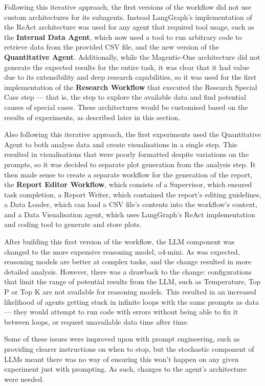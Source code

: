 \documentclass[a4paper]{report}
\begin{document}
Following this iterative approach, the first versions of the workflow did not use custom architectures for its subagents. Instead LangGraph's implementation of the ReAct architecture was used for any agent that required tool usage, such as the \textbf{Internal Data Agent}, which now used a tool to run arbitrary code to retrieve data from the provided CSV file, and the new version of the \textbf{Quantitative Agent}. Additionally, while the Magentic-One architecture did not generate the expected results for the entire task, it was clear that it had value due to its extensibility and deep research capabilities, so it was used for the first implementation of the \textbf{Research Workflow} that executed the Research Special Case step --- that is, the step to explore the available data and find potential causes of special cases. These architectures would be customised based on the results of experiments, as described later in this section.

Also following this iterative approach, the first experiments used the Quantitative Agent to both analyse data and create visualisations in a single step. This resulted in visualisations that were poorly formatted despite variations on the prompts, so it was decided to separate plot generation from the analysis step. It then made sense to create a separate workflow for the generation of the report, the \textbf{Report Editor Workflow}, which consists of a Supervisor, which ensured task completion, a Report Writer, which contained the report's editing guidelines, a Data Loader, which can load a CSV file's contents into the workflow's context, and a Data Visualisation agent, which uses LangGraph's ReAct implementation and coding tool to generate and store plots.

After building this first version of the workflow, the LLM component was changed to the more expensive reasoning model, o4-mini. As was expected, reasoning models are better at complex tasks, and the change resulted in more detailed analysis. However, there was a drawback to the change: configurations that limit the range of potential results from the LLM, such as Temperature, Top P or Top K are not available for reasoning models. This resulted in an increased likelihood of agents getting stuck in infinite loops with the same prompts as data --- they would attempt to run code with errors without being able to fix it between loops, or request unavailable data time after time.

Some of these issues were improved upon with prompt engineering, such as providing clearer instructions on when to stop, but the stochastic component of LLMs meant there was no way of ensuring this won't happen on any given experiment just with prompting. As such, changes to the agent's architecture were needed.
\end{document}
